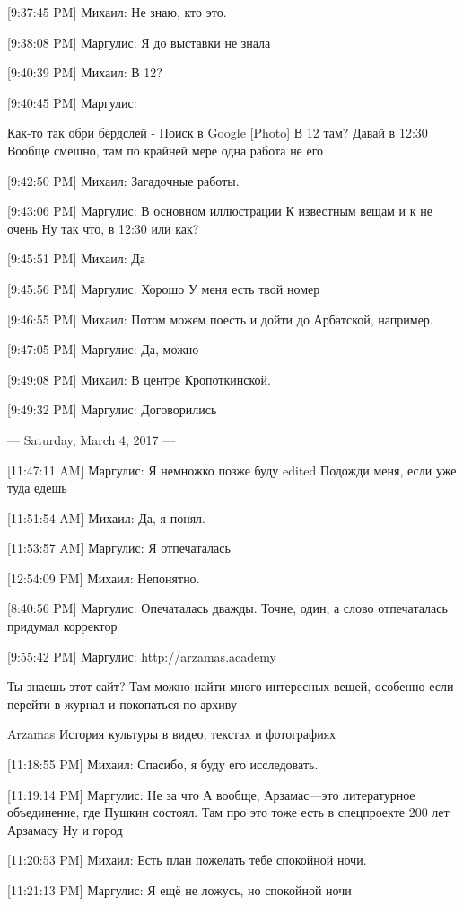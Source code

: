 \documentclass{article}
\begin{document}
[9:37:45 PM] Михаил:
Не знаю, кто это.

[9:38:08 PM] Маргулис:
Я до выставки не знала

[9:40:39 PM] Михаил:
В 12?

[9:40:45 PM] Маргулис:


Как-то так
обри бёрдслей - Поиск в Google
[Photo]
 В 12 там?
 Давай в 12:30
 Вообще смешно, там по крайней мере одна работа не его

[9:42:50 PM] Михаил:
Загадочные работы.

[9:43:06 PM] Маргулис:
В основном иллюстрации
 К известным вещам и к не очень
 Ну так что, в 12:30 или как?

[9:45:51 PM] Михаил:
Да

[9:45:56 PM] Маргулис:
Хорошо
 У меня есть твой номер

[9:46:55 PM] Михаил:
Потом можем поесть и дойти до Арбатской, например.

[9:47:05 PM] Маргулис:
Да, можно

[9:49:08 PM] Михаил:
В центре Кропоткинской.

[9:49:32 PM] Маргулис:
Договорились

--- Saturday, March 4, 2017 ---

[11:47:11 AM] Маргулис:
Я немножко позже буду
edited 
Подожди меня, если уже туда едешь

[11:51:54 AM] Михаил:
Да, я понял.

[11:53:57 AM] Маргулис:
Я отпечаталась

[12:54:09 PM] Михаил:
Непонятно.

[8:40:56 PM] Маргулис:
Опечаталась дважды. Точне, один, а слово отпечаталась придумал корректор

[9:55:42 PM] Маргулис:
http://arzamas.academy

Ты знаешь этот сайт? Там можно найти много интересных вещей, особенно если перейти в журнал и покопаться по архиву

Arzamas
История культуры в видео, текстах и фотографиях

[11:18:55 PM] Михаил:
Спасибо, я буду его исследовать.

[11:19:14 PM] Маргулис:
Не за что
 А вообще, Арзамас—это литературное объединение, где Пушкин состоял. Там про это тоже есть в спецпроекте 200 лет Арзамасу
 Ну и город

[11:20:53 PM] Михаил:
Есть план пожелать тебе спокойной ночи.

[11:21:13 PM] Маргулис:
Я ещё не ложусь, но спокойной ночи
\end{document}
